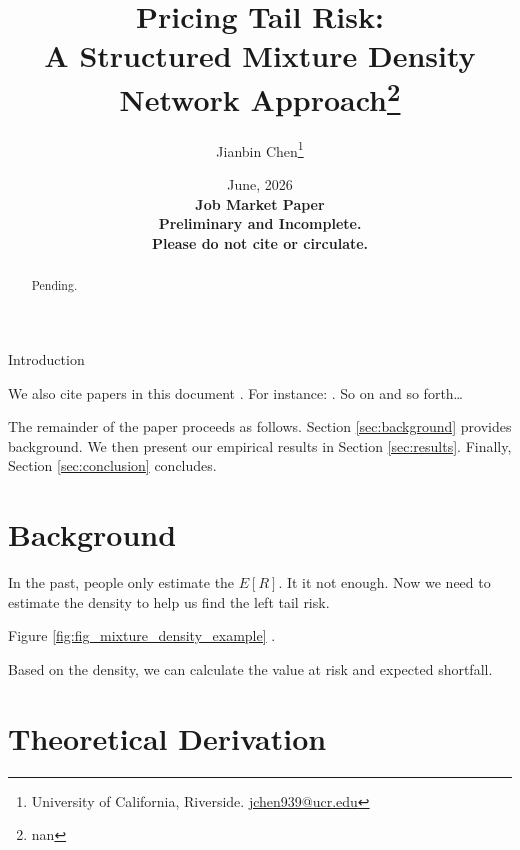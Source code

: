 \documentclass[12pt]{article}
\title{ \vspace*{-2.5cm} \hspace*{-0.5cm}Pricing Tail Risk: \\ A Structured Mixture Density Network Approach\footnote{
nan
}}
\author{Jianbin Chen\thanks{University of California, Riverside.
\href{mailto:jchen939@ucr.edu}{jchen939@ucr.edu}} }
\date{ \vspace*{0.5cm} June, 2026\\
\textbf{Job Market Paper \\ Preliminary and Incomplete. \\ Please do not cite or circulate.}
}
\begin{document}
\bgroup
\let\footnoterule\relax

\begin{singlespace}
\maketitle


\begin{abstract}
    \noindent Pending.
\end{abstract}
\end{singlespace}
\thispagestyle{empty}

\clearpage
\egroup
\setcounter{page}{1}



\noindent Introduction

We also cite papers in this document \citep{Chetty2013}. For instance: \citet{Hansen1992}. So on and so forth\ldots

The remainder of the paper proceeds as follows. Section \ref{sec:background} provides background. We then present our
empirical results in Section \ref{sec:results}. Finally, Section \ref{sec:conclusion} concludes. 

\section{Background \label{sec:background}}

In the past, people only estimate the $E[R]$. It it not enough. Now we need to estimate the density to help us find the left tail risk. 



Figure \ref{fig:fig_mixture_density_example} .

Based on the density, we can calculate the value at risk and expected shortfall. 



\section{Theoretical Derivation}
\end{document}

